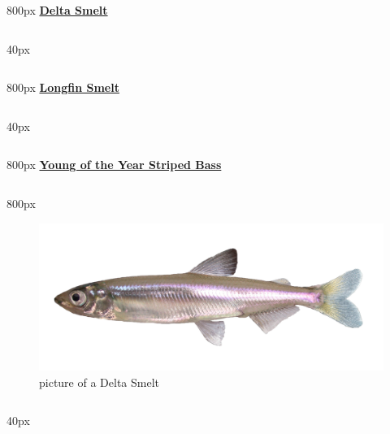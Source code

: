 \documentclass[
]{book}
\begin{document}
\begin{column}{800px\textwidth}
\textbf{\href{http://calfish.ucdavis.edu/species/?uid=47\&ds=698}{Delta Smelt}}
\end{column}

\begin{column}{40px\textwidth}
~
\end{column}

\begin{column}{800px\textwidth}
\textbf{\href{http://calfish.ucdavis.edu/species/?uid=87\&ds=698}{Longfin Smelt}}
\end{column}

\begin{column}{40px\textwidth}
~
\end{column}

\begin{column}{800px\textwidth}
\textbf{\href{http://calfish.ucdavis.edu/species/?uid=160\&ds=698}{Young of the Year Striped Bass}}
\end{column}

\begin{column}{800px\textwidth}
\begin{figure}

{\centering \includegraphics[width=29.17in]{figures/delta_smelt} 

}

\caption{picture of a Delta Smelt}\label{fig:unnamed-chunk-121}
\end{figure}
\end{column}

\begin{column}{40px\textwidth}
~
\end{column}
\end{document}
